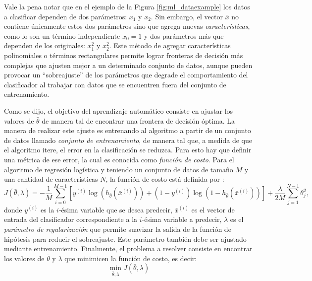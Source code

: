 Vale la pena notar que en el ejemplo de la Figura \ref{fig:ml_dataexample} los datos a clasificar dependen de dos parámetros: $x_1$ y $x_2$. Sin embargo, el vector $\bar{x}$ no contiene únicamente estos dos parámetros sino que agrega nuevas \emph{características}, como lo son un término independiente $x_0=1$ y dos parámetros más que dependen de los originales: $x_1^2$ y $x_2^2$. Este método de agregar características polinomiales o términos rectangulares permite lograr fronteras de decisión más complejas que ajusten mejor a un determinado conjunto de datos, aunque pueden provocar un ``sobreajuste'' de los parámetros que degrade el comportamiento del clasificador al trabajar con datos que se encuentren fuera del conjunto de entrenamiento.

Como se dijo, el objetivo del aprendizaje automático consiste en ajustar los valores de $\bar{\theta}$ de manera tal de encontrar una frontera de decisión óptima. La manera de realizar este ajuste es entrenando al algoritmo a partir de un conjunto de datos llamado \emph{conjunto de entrenamiento}, de manera tal que, a medida de que el algoritmo itere, el error en la clasificación se reduzca. Para esto hay que definir una métrica de ese error, la cual es conocida como \emph{función de costo}. Para el algoritmo de regresión logística y teniendo un conjunto de datos de tamaño $M$ y una cantidad de características $N$, la función de costo está definida por \cite{bib:machinelearning}:
\begin{equation}
  J(\bar{\theta},\lambda)= -\frac{1}{M}\sum_{i=0}^{M-1} \left[y^{(i)} \log\left(h_{\bar{\theta}}(\bar{x}^{(i)})\right) + (1-y^{(i)}) \log\left(1-h_{\bar{\theta}}(\bar{x}^{(i)})\right) \right]+\frac{\lambda}{2M}\sum_{j=1}^{N-1}\theta_j^2,
  \label{eq:ml_costfunction}
\end{equation}
donde $y^{(i)}$ es la $i$-ésima variable que se desea predecir, $\bar{x}^{(i)}$ es el vector de entrada del clasificador correspondiente a la $i$-ésima variable a predecir, $\lambda$ es el \emph{parámetro de regularización} que permite suavizar la salida de la función de hipótesis para reducir el sobreajuste. Este parámetro también debe ser ajustado mediante entrenamiento. Finalmente, el problema a resolver consiste en encontrar los valores de $\bar{\theta}$ y $\lambda$ que minimicen la función de costo, es decir:
\begin{equation}
  \min_{\bar{\theta},\lambda} J(\bar{\theta},\lambda)
\end{equation}

